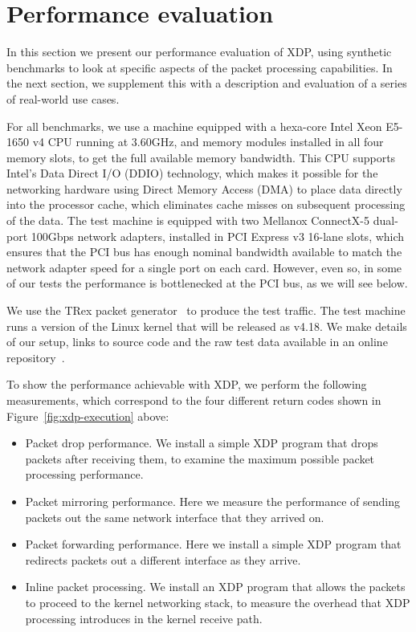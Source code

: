 \documentclass[10pt,sigconf]{acmart}
\begin{document}
\section{Performance evaluation}
\label{sec:perf-eval}
In this section we present our performance evaluation of XDP, using synthetic
benchmarks to look at specific aspects of the packet processing capabilities. In
the next section, we supplement this with a description and evaluation of a
series of real-world use cases.

For all benchmarks, we use a machine equipped with a hexa-core Intel Xeon
E5-1650 v4 CPU running at 3.60GHz, and memory modules installed in all four
memory slots, to get the full available memory bandwidth. This CPU supports
Intel's Data Direct I/O (DDIO) technology, which makes it possible for the
networking hardware using Direct Memory Access (DMA) to place data directly into
the processor cache, which eliminates cache misses on subsequent processing of
the data. The test machine is equipped with two Mellanox ConnectX-5 dual-port
100Gbps network adapters, installed in PCI Express v3 16-lane slots, which
ensures that the PCI bus has enough nominal bandwidth available to match the
network adapter speed for a single port on each card. However, even so, in some
of our tests the performance is bottlenecked at the PCI bus, as we will see
below.

We use the TRex packet generator~\cite{cisco18:_trex_traff_gener} to produce the
test traffic. The test machine runs a version of the Linux kernel that will
be released as v4.18. We make details of our setup, links to source code and the
raw test data available in an online repository~\cite{test-data}.

To show the performance achievable with XDP, we perform the following
measurements, which correspond to the four different return codes shown in
Figure~\ref{fig:xdp-execution} above:

\begin{itemize}
\item Packet drop performance. We install a simple XDP program that drops
  packets after receiving them, to examine the maximum possible packet
  processing performance.

\item Packet mirroring performance. Here we measure the performance of sending
  packets out the same network interface that they arrived on.

\item Packet forwarding performance. Here we install a simple XDP program that
  redirects packets out a different interface as they arrive.

\item Inline packet processing. We install an XDP program that allows the
  packets to proceed to the kernel networking stack, to measure the overhead
  that XDP processing introduces in the kernel receive path.
\end{itemize}
\end{document}
